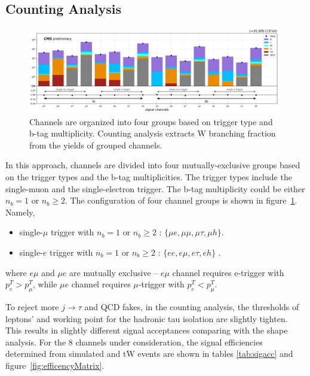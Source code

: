 \FloatBarrier




\subsection{Counting Analysis}


\begin{figure}[htb!]
    \centering
    \includegraphics[width=0.99\textwidth]{chapters/Analysis/sectionStatisticalAnalysis/figures/counting.png}
    \caption{ Channels are organized into four groups based on trigger type and 
    b-tag multiplicity. Counting analysis extracts W branching fraction from the yields
    of grouped channels.}
    \label{fig:groupsofchannel}
\end{figure}

In this approach, channels are divided into four mutually-exclusive groups based on the trigger types and the b-tag multiplicities. 
The trigger types include the single-muon and the single-electron trigger. The b-tag multiplicity could be either $n_b=1$ or $n_b \geq 2$.
The configuration of four channel groups is shown in figure~\ref{fig:groupsofchannel}. Namely,

\begin{itemize}
    \item single-$\mu$ trigger with $n_b=1$ or $n_b \geq 2$ : $\big \{ \mu e, \mu\mu, \mu\tau, \mu h \big  \}$.
    \item single-$e$ trigger with $n_b=1$ or $n_b \geq 2$ : $ \big  \{ e e, e\mu, e\tau, e h \big  \}$ .
\end{itemize}


\noindent where $e\mu$ and $\mu e$ are mutually exclusive -- $e\mu$ channel
requires e-trigger with $p^T_e > p^T_\mu$, while $\mu e$ channel
requires $\mu$-trigger with $p^T_e < p^T_\mu$. 




To reject more $j\to \tau$ and QCD fakes, in the counting analysis, the thresholds of leptons' \pt 
and working point for the hadronic tau isolation are slightly tighten. 
This results in slightly different signal
acceptances comparing with the shape analysis. For the 8 channels under consideration, 
the signal efficiencies determined from
simulated \ttbar and tW events are shown in
tables \ref{tab:sigacc} and figure~\ref{fig:efficencyMatrix}. 

